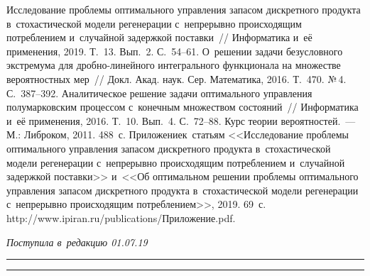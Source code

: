 \begin{multicols}{2}
{\small\frenchspacing
 {%
 \begin{thebibliography}{9}
 Исследование проб\-ле\-мы оптимального 
управ\-ле\-ния запасом дискретного продукта в~стохастической модели 
регенерации с~непрерывно происходящим по\-треб\-ле\-ни\-ем и~случайной 
задержкой по\-став\-ки~// Информатика и~её применения, 2019. Т.~13. Вып.~2. 
С.~54--61.
 О~решении задачи безусловного экстремума для  
дроб\-но-ли\-ней\-но\-го интегрального функционала на множестве вероятностных 
мер~// Докл. Акад. наук. Сер. Математика, 2016. Т.~470. №\,4. С.~387--392.
 Аналитическое решение 
задачи оптимального управ\-ле\-ния полумарковским процессом с~конечным 
множеством со\-сто\-яний~// Информатика и~её применения, 2016. Т.~10. Вып.~4. 
С.~72--88. 
 Курс теории вероятностей.~--- М.: Либ\-ро\-ком, 2011. 488~с.
 Приложение\linebreak к~статьям <<Исследование 
проб\-ле\-мы оптимального управ\-ле\-ния запасом дис\-крет\-но\-го продукта 
в~стохастической модели регенерации с~непрерывно происходящим 
по\-треб\-ле\-ни\-ем и~случайной задержкой по\-став\-ки>> и~<<Об оптимальном 
решении проб\-ле\-мы оптимального управ\-ле\-ния запасом дискретного продукта 
в~стохастической модели регенерации с~непрерывно происходящим 
по\-треб\-ле\-ни\-ем>>, 2019. 69~с. {\sf http://www.ipiran.ru/publications/Приложение.pdf}.
 \end{thebibliography}

 }
 }

\end{multicols}

\vspace*{-6pt}

\hfill{\small\textit{Поступила в~редакцию 01.07.19}}

\vspace*{6pt}




\hrule

\vspace*{2pt}

\hrule

\vspace*{-1pt}

